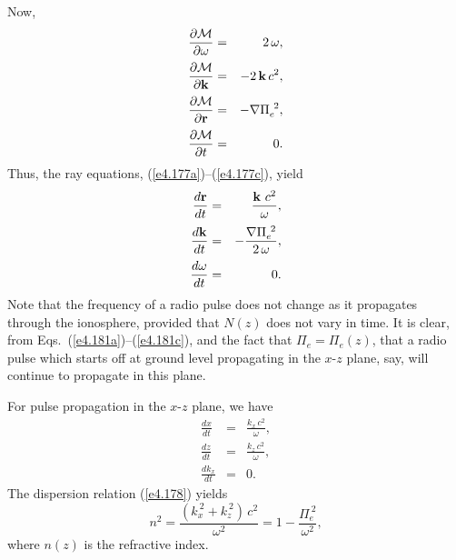 Now,
\begin{eqnarray}
\frac{\partial{\cal M}}{\partial\omega} &=& 2\,\omega,\\[0.5ex]
\frac{\partial{\cal M}}{\partial {\bf k}} &=& - 2\,{\bf k}\,c^2,\\[0.5ex]
\frac{\partial{\cal M}}{\partial{\bf r}} &=& -\nabla{\Pi}_e^{~2},\\[0.5ex]
\frac{\partial{\cal M}}{\partial t} &=& 0.
\end{eqnarray}
Thus, the ray equations, (\ref{e4.177a})--(\ref{e4.177c}), yield
\begin{eqnarray}\label{e4.181a}
\frac{d{\bf r}}{dt}& = &\frac{{\bf k}\,\,c^2}{\omega},\\[0.5ex]
\frac{d{\bf k}}{dt} &=& - \frac{\nabla{\Pi}_e^{~2}}{2\,\omega},\\[0.5ex]
\frac{d\omega}{dt} &=& 0.\label{e4.181c}
\end{eqnarray}
Note that the frequency of a radio pulse does not change as it
propagates through the ionosphere, provided that $N(z)$ does not vary in time.
 It is clear, from Eqs.~(\ref{e4.181a})--(\ref{e4.181c}), and the fact that ${\Pi}_e={\Pi}_e(z)$, that
a radio pulse which starts off at ground level propagating in the $x$-$z$ plane, say,
will continue to propagate in this plane. 

For pulse propagation in the $x$-$z$ plane, we have
\begin{eqnarray}
\frac{dx}{dt} &=& \frac{k_x\,c^2}{\omega},\label{e4.182a}\\[0.5ex]
\frac{dz}{dt} &=& \frac{k_z\,c^2}{\omega},\label{e4.182b}\\[0.5ex]
\frac{d k_x}{dt} &=& 0.\label{e4.182c}
\end{eqnarray}
The dispersion relation (\ref{e4.178}) yields
\begin{equation} \label{e4.183}
n^2 = \frac{(k_x^{~2} + k_z^{~2})\,c^2}{\omega^2} = 1-\frac{{\Pi}_e^{~2}}{\omega^2},
\end{equation}
where $n(z)$ is the refractive index. 


